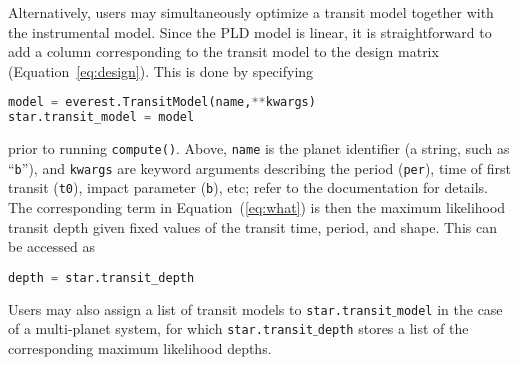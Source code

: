 \documentclass[]{aastex62}
\newenvironment{edits}{\color{red}}{\color{black}}
\begin{document}
\begin{edits}
Alternatively, users may simultaneously optimize a transit model together
with the instrumental model. Since the PLD model is linear, it is straightforward
to add a column corresponding to the transit model to the design matrix
(Equation~\ref{eq:design}). This is done by specifying
%
\begin{lstlisting}[language=Python]
model = everest.TransitModel(name,**kwargs)
star.transit_model = model
\end{lstlisting}
%
prior to running \texttt{compute()}. Above, \texttt{name} is the
planet identifier (a string, such as ``\texttt{b}''),
and \texttt{kwargs} are keyword arguments describing the
period (\texttt{per}), time of first transit (\texttt{t0}),
impact parameter (\texttt{b}), etc; refer to the documentation for details.
%
The corresponding term in Equation~(\ref{eq:what}) is then
the maximum likelihood transit depth given fixed values of the transit time,
period, and shape. This can be accessed as
%
\begin{lstlisting}[language=Python]
depth = star.transit_depth
\end{lstlisting}
%
Users may also assign a list of transit models to \texttt{star.transit$\_$model} in
the case of a multi-planet system, for which \texttt{star.transit$\_$depth} stores
a list of the corresponding maximum likelihood depths.


\end{edits}
\end{document}
